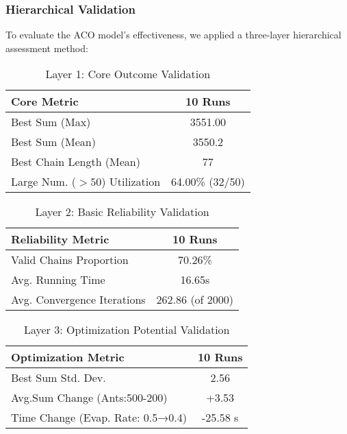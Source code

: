 \documentclass[twocolumn, a4paper]{article}
\begin{document}
\subsubsection{Hierarchical Validation}
To evaluate the ACO model's effectiveness, we applied a three-layer hierarchical assessment method:
\begin{table}[htbp]
  \centering
  \setlength{\tabcolsep}{4pt} %
  \caption{Layer 1: Core Outcome Validation}
  \begin{tabular}{@{}lc@{}} %
    \toprule
    \textbf{Core Metric}         & \textbf{10 Runs} \\
    \midrule
    Best Sum (Max)               & 3551.00 \\
    Best Sum (Mean)              & 3550.2 \\
    Best Chain Length (Mean)     & 77 \\
    Large Num. ($>50$) Utilization & 64.00\% (32/50) \\
    \bottomrule
  \end{tabular}
  \label{tab:core}
\end{table}
\begin{table}[htbp]
  \centering
  \setlength{\tabcolsep}{4pt}
  \caption{Layer 2: Basic Reliability Validation}
  \begin{tabular}{@{}lc@{}}
    \toprule
    \textbf{Reliability Metric}   & \textbf{10 Runs} \\
    \midrule
    Valid Chains Proportion       & 70.26\% \\
    Avg. Running Time             & 16.65s \\
    Avg. Convergence Iterations   & 262.86 (of 2000) \\
    \bottomrule
  \end{tabular}
  \label{tab:reliability}
\end{table}
\begin{table}[htpb]
  \centering
  \setlength{\tabcolsep}{4pt}
  \caption{Layer 3: Optimization Potential Validation}
  \begin{tabular}{@{}lc@{}}
    \toprule
    \textbf{Optimization Metric}             & \textbf{10 Runs} \\
    \midrule
    Best Sum Std. Dev.                       & 2.56 \\
    Avg.Sum Change (Ants:500-200)            & +3.53  \\
    Time Change (Evap. Rate: 0.5→0.4)        & -25.58 s \\
    \bottomrule
  \end{tabular}
  \label{tab:optimization}
\end{table}
\end{document}
